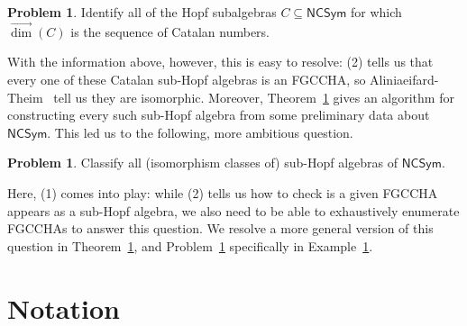 \documentclass[11pt]{amsart}
\theoremstyle{definition}
\newtheorem{problem}[theorem]{Problem}
\numberwithin{equation}{section}
\newcommand{\FGCCHA}{\textsf{FGCCHA}\xspace}
\newcommand{\FGCCHAs}{\textsf{FGCCHA}s\xspace}
\newcommand{\vecdim}{\overrightarrow{\dim}}
\begin{document}
\begin{problem}
\label{prob1}
Identify all of the Hopf subalgebras $C \subseteq \mathsf{NCSym}$ for which $\vecdim(C)$ is the sequence of Catalan numbers.
\end{problem}

With the information above, however, this is easy to resolve: (2) tells us that every one of these Catalan sub-Hopf algebras is an \FGCCHA, so Aliniaeifard-Theim~\cite{AT20} tell us they are isomorphic.  Moreover, Theorem~\ref{} gives an algorithm for constructing every such sub-Hopf algebra from some preliminary data about $\mathsf{NCSym}$.  This led us to the following, more ambitious question.

\begin{problem}
\label{prob2}
Classify all (isomorphism classes of) sub-Hopf algebras of $\mathsf{NCSym}$.
\end{problem}

Here, (1) comes into play: while (2) tells us how to check is a given \FGCCHA appears as a sub-Hopf algebra, we also need to be able to exhaustively enumerate \FGCCHAs to answer this question.  
We resolve a more general version of this question in Theorem~\ref{}, and Problem~\ref{prob2} specifically in Example~\ref{}.  

%
%
%
%
%

\section{Notation}
\end{document}
